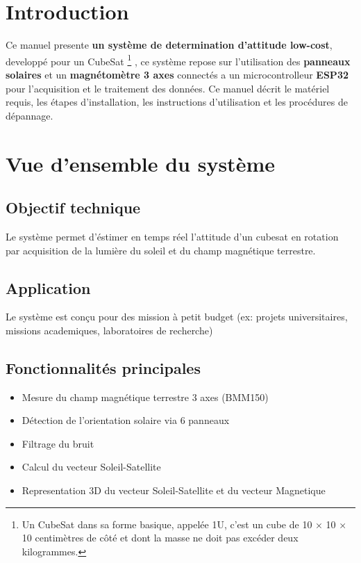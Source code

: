 \documentclass[a4paper,12pt]{article}
\begin{document}
\newpage
\tableofcontents
\newpage
\newpage

\section{Introduction}
Ce manuel presente \textbf{un système de determination d'attitude low-cost}, developpé pour un CubeSat \footnote{Un CubeSat dans sa forme basique, appelée 1U, c'est un cube de 10 × 10 × 10 centimètres de côté et dont la masse ne doit pas excéder deux kilogrammes.} \cite{noauthor_cubesat_2025}, ce système repose sur l'utilisation des \textbf{panneaux solaires} et un \textbf{magnétomètre 3 axes} connectés a un microcontrolleur \textbf{ESP32} pour l'acquisition et le traitement des données. Ce manuel décrit le matériel requis, les étapes d'installation, les instructions d'utilisation et les procédures de dépannage.

\section{Vue d’ensemble du système}
\subsection{Objectif technique}
Le système permet d'éstimer en temps réel l’attitude d’un cubesat en rotation par acquisition de la lumière du soleil et du champ magnétique terrestre.

\subsection{Application}
Le système est conçu pour des mission à petit budget (ex: projets universitaires, missions academiques, laboratoires de recherche)

\subsection{Fonctionnalités principales}
\begin{itemize}
 \item Mesure du champ magnétique terrestre 3 axes (BMM150)
 \item Détection de l’orientation solaire via 6 panneaux
 \item Filtrage du bruit 
 \item Calcul du vecteur Soleil-Satellite
 \item Representation 3D du vecteur Soleil-Satellite et du vecteur Magnetique
\end{itemize}
\end{document}
